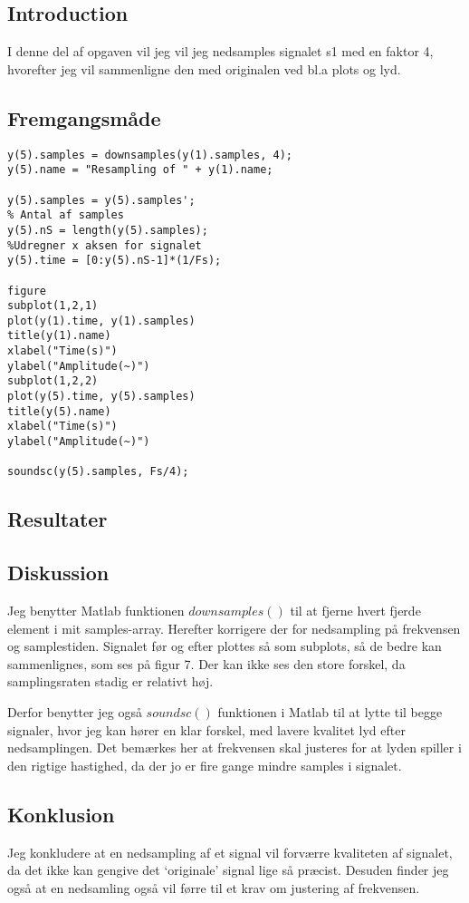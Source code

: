 \documentclass[../main.tex]{subfiles}
\begin{document}
\subsection{Introduction}

I denne del af opgaven vil jeg vil jeg nedsamples signalet s1 med en faktor 4, hvorefter jeg vil sammenligne den med originalen ved bl.a plots og lyd.

\subsection{Fremgangsmåde}

\begin{lstlisting}[caption={Matlab kode for øvelse 5 \& 6}, label={lst:myLSTdsadsa}]
%Definer nedsampling af signal
y(5).samples = downsamples(y(1).samples, 4);
y(5).name = "Resampling of " + y(1).name;

y(5).samples = y(5).samples';
% Antal af samples
y(5).nS = length(y(5).samples);
%Udregner x aksen for signalet
y(5).time = [0:y(5).nS-1]*(1/Fs);

figure
subplot(1,2,1)
plot(y(1).time, y(1).samples)
title(y(1).name)
xlabel("Time(s)")
ylabel("Amplitude(~)")
subplot(1,2,2)
plot(y(5).time, y(5).samples)
title(y(5).name)
xlabel("Time(s)")
ylabel("Amplitude(~)")

soundsc(y(5).samples, Fs/4);

\end{lstlisting}

\subsection{Resultater}



\subsection{Diskussion}

Jeg benytter Matlab funktionen $downsamples()$ til at fjerne hvert fjerde element i mit samples-array. Herefter korrigere der for nedsampling på frekvensen og samplestiden. Signalet før og efter plottes så som subplots, så de bedre kan sammenlignes, som ses på figur 7. Der kan ikke ses den store forskel, da samplingsraten stadig er relativt høj.\vspace{0.1cm}

 Derfor benytter jeg også $soundsc()$ funktionen i Matlab til at lytte til begge signaler, hvor jeg kan hører en klar forskel, med lavere kvalitet lyd efter nedsamplingen. Det bemærkes her at frekvensen skal justeres for at lyden spiller i den rigtige hastighed, da der jo er fire gange mindre samples i signalet.

\subsection{Konklusion}
Jeg konkludere at en nedsampling af et signal vil forværre kvaliteten af signalet, da det ikke kan gengive det `originale' signal lige så præcist. Desuden finder jeg også at en nedsamling også vil førre til et krav om justering af frekvensen.
\end{document}
